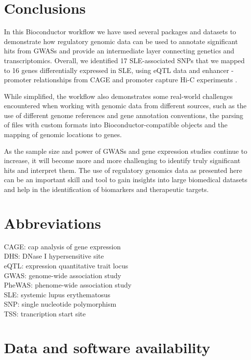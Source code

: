 \documentclass[9pt,a4paper,]{extarticle}
\begin{document}
\section{Conclusions}\label{conclusions}

In this Bioconductor workflow we have used several packages and datasets to demonstrate how regulatory genomic data can be used to annotate significant hits from GWASs and provide an intermediate layer connecting genetics and transcriptomics.
Overall, we identified 17 SLE-associated SNPs that we mapped to 16 genes differentially expressed in SLE, using eQTL data \citep{GTEx2017a} and enhancer - promoter relationships from CAGE \citep{Fantom2014} and promoter capture Hi-C experiments \citep{Javierre2016}.

While simplified, the workflow also demonstrates some real-world challenges encountered when working with genomic data from different sources, such as the use of different genome references and gene annotation conventions, the parsing of files with custom formats into Bioconductor-compatible objects and the mapping of genomic locations to genes.

As the sample size and power of GWASs and gene expression studies continue to increase, it will become more and more challenging to identify truly significant hits and interpret them.
The use of regulatory genomics data as presented here can be an important skill and tool to gain insights into large biomedical datasets and help in the identification of biomarkers and therapeutic targets.

\section{Abbreviations}\label{abbreviations}

CAGE: cap analysis of gene expression\\
DHS: DNase I hypersensitive site\\
eQTL: expression quantitative trait locus\\
GWAS: genome-wide association study\\
PheWAS: phenome-wide association study\\
SLE: systemic lupus erythematosus\\
SNP: single nucleotide polymorphism\\
TSS: trancription start site

\section{Data and software availability}\label{data-and-software-availability}
\end{document}
